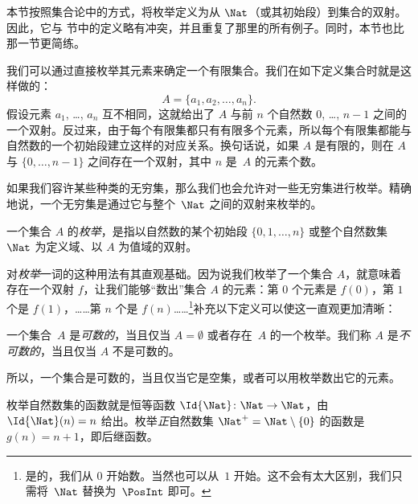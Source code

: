 \documentclass[../../../include/open-logic-section]{subfiles}
\begin{document}


\begin{editorial}
  本节按照集合论中的方式，将枚举定义为从 $\Nat$（或其初始段）到集合的双射。因此，它与  节中的定义略有冲突，并且重复了那里的所有例子。同时，本节也比那一节更简练。
\end{editorial}

我们可以通过直接枚举其元素来确定一个有限集合。我们在如下定义集合时就是这样做的：
\[
  A = \{a_1, a_2, \ldots, a_n\}.
\]
假设元素 $a_1$, \dots, $a_n$ 互不相同，这就给出了 $A$ 与前 $n$ 个自然数 $0$, \dots, $n-1$ 之间的一个双射。反过来，由于每个有限集都只有有限多个元素，所以每个有限集都能与自然数的一个初始段建立这样的对应关系。换句话说，如果 $A$ 是有限的，则在 $A$ 与 $\{0, \dots, n-1\}$ 之间存在一个双射，其中 $n$ 是~$A$ 的元素个数。

如果我们容许某些种类的无穷集，那么我们也会允许对一些无穷集进行枚举。精确地说，一个无穷集是通过它与整个~$\Nat$ 之间的双射来枚举的。

\begin{defn}[枚举]
一个集合 $A$ 的\emph{枚举}，是指以自然数的某个初始段 $\{0,
1, \ldots, n\}$ {或}整个自然数集~$\Nat$ 为定义域、以 $A$ 为值域的双射。
\end{defn}

\begin{explain}
对\emph{枚举}一词的这种用法有其直观基础。因为说我们枚举了一个集合 $A$，就意味着存在一个双射 $f$，让我们能够“数出”集合 $A$ 的元素：第 $0$ 个元素是 $f(0)$，第 $1$ 个是 $f(1)$，……第 $n$ 个是 $f(n)$……\footnote{是的，我们从 $0$ 开始数。当然也可以从~$1$ 开始。这不会有太大区别，我们只需将~$\Nat$ 替换为~$\PosInt$ 即可。}补充以下定义可以使这一直观更加清晰：
\end{explain}

\begin{defn}
  一个集合~$A$ 是\emph{可数的}，当且仅当 $A = \emptyset$ 或者存在~$A$ 的一个枚举。我们称 $A$ 是\emph{不可数的}，当且仅当 $A$ 不是可数的。
\end{defn}

\begin{explain}
所以，一个集合是可数的，当且仅当它是空集，或者可以用枚举数出它的元素。
\end{explain}

\begin{ex}
枚举自然数集的函数就是恒等函数 $\Id{\Nat} \colon \Nat \to \Nat$，由 $\Id{\Nat}(n) = n$ 给出。枚举\emph{正}自然数集 $\Nat^+ =
\Nat \setminus \{0\}$ 的函数是 $g(n) = n + 1$，即后继函数。
\end{ex}
\end{document}
